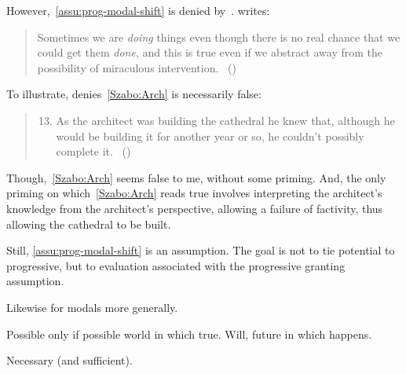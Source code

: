 \begin{note}
{    However,~\autoref{assu:prog-modal-shift} is denied by~\textcite{Szabo:2004ul}.
    \citeauthor{Szabo:2004ul} writes:
    \begin{quote}
      Sometimes we are \emph{doing} things even though there is no real chance that we could get them \emph{done}, and this is true even if we abstract away from the possibility of miraculous intervention.%
      \mbox{ }\hfill\mbox{(\citeyear[40]{Szabo:2004ul})}
    \end{quote}
    To illustrate, \citeauthor{Szabo:2004ul} denies~\ref{Szabo:Arch} is necessarily false:
    \begin{quote}
      \begin{enumerate}[label=(\arabic*), ref=(\arabic*)]
        \setcounter{enumi}{12}
      \item
        \label{Szabo:Arch}
        As the architect was building the cathedral he knew that, although he would be building it for another year or so, he couldn't possibly complete it.%
        \mbox{ }\hfill\mbox{(\citeyear[38]{Szabo:2004ul})}
      \end{enumerate}
    \end{quote}
    Though,~\ref{Szabo:Arch} seems false to me, without some priming.
    And, the only priming on which~\ref{Szabo:Arch} reads true involves interpreting the architect's knowledge from the architect's perspective, allowing a failure of factivity, thus allowing the cathedral to be built.

    Still, \autoref{assu:prog-modal-shift} is an assumption.
    The goal is not to tie potential to progressive, but to evaluation associated with the progressive granting assumption.
  }


  Likewise for modals more generally.

  Possible only if possible world in which true.
  Will, future in which happens.

  Necessary (and sufficient).
\end{note}

